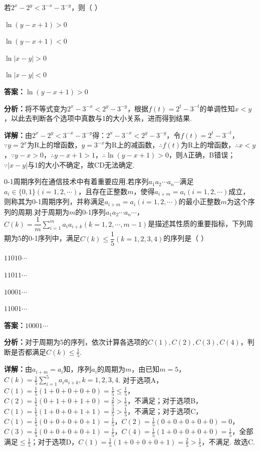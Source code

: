 \begin{question}[points=5]
若$2^x-2^y<3^{-x}-3^{-y}$，则（ ）
\begin{choices}
  \item $\ln(y-x+1)>0$
  \item $\ln(y-x+1)<0$
  \item $\ln|x-y|>0$
  \item $\ln|x-y|<0$
\end{choices}
\begin{solution}
\textbf{答案：}$\ln(y-x+1)>0$

\textbf{分析：}将不等式变为$2^x-3^{-x}<2^y-3^{-y}$，根据$f(t)=2^t-3^{-t}$的单调性知$x<y$，以此去判断各个选项中真数与1的大小关系，进而得到结果.

\textbf{详解：}由$2^x-2^y<3^{-x}-3^{-y}$得：$2^x-3^{-x}<2^y-3^{-y}$，令$f(t)=2^t-3^{-t}$，$\because y=2^x$为R上的增函数，$y=3^{-x}$为R上的减函数，$\therefore f(t)$为R上的增函数，$\therefore x<y$，$\because y-x>0$，$\therefore y-x+1>1$，$\therefore\ln(y-x+1)>0$，则A正确，B错误；$\because|x-y|$与1的大小不确定，故CD无法确定.
\end{solution}
\end{question}

\begin{question}[points=5]
0-1周期序列在通信技术中有着重要应用.若序列$a_1a_2\cdots a_n\cdots$满足$a_i\in\{0,1\}(i=1,2,\cdots)$，且存在正整数$m$，使得$a_{i+m}=a_i(i=1,2,\cdots)$成立，则称其为0-1周期序列，并称满足$a_{i+m}=a_i(i=1,2,\cdots)$的最小正整数$m$为这个序列的周期.对于周期为$m$的0-1序列$a_1a_2\cdots a_n\cdots$，$C(k)=\dfrac1m\sum\limits_{i=1}^m a_i a_{i+k}(k=1,2,\cdots,m-1)$是描述其性质的重要指标，下列周期为5的0-1序列中，满足$C(k)\le\dfrac15(k=1,2,3,4)$的序列是（ ）
\begin{choices}
  \item $11010\cdots$
  \item $11011\cdots$
  \item $10001\cdots$
  \item $11001\cdots$
\end{choices}
\begin{solution}
\textbf{答案：}$10001\cdots$

\textbf{分析：}对于周期为5的序列，依次计算各选项的$C(1),C(2),C(3),C(4)$，判断是否都满足$C(k)\le\frac15$.

\textbf{详解：}由$a_{i+m}=a_i$知，序列$a_i$的周期为$m$，由已知$m=5$，$C(k)=\frac15\sum_{i=1}^5 a_i a_{i+k},k=1,2,3,4$. 对于选项A，$C(1)=\frac15(1+0+0+0+0)=\frac15\le\frac15$，$C(2)=\frac15(0+1+0+1+0)=\frac25>\frac15$，不满足；对于选项B，$C(1)=\frac15(1+0+0+1+1)=\frac35>\frac15$，不满足；对于选项C，$C(1)=\frac15(0+0+0+0+1)=\frac15$，$C(2)=\frac15(0+0+0+0+0)=0$，$C(3)=\frac15(0+0+0+0+1)=\frac15$，$C(4)=\frac15(1+0+0+0+0)=\frac15$，全部满足$\le\frac15$；对于选项D，$C(1)=\frac15(1+0+0+0+1)=\frac25>\frac15$，不满足. 故选C.
\end{solution}
\end{question}

